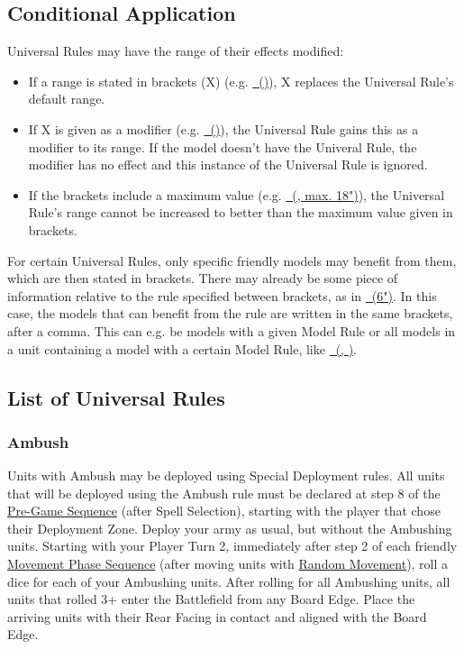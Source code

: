 \subsection{Conditional Application}
\label{conditional_application_of_rules}
Universal Rules may have the range of their effects modified:
\begin{itemize}
	\item If a range is stated in brackets (X) (e.g. \hyperref[rally_around_the_flag]{\rallyaroundtheflag\ ()}), X replaces the Universal Rule's default range.
	\item If X is given as a modifier (e.g. \hyperref[commanding_presence]{\commandingpresence\ ()}), the Universal Rule gains this as a modifier to its range. If the model doesn’t have the Univeral Rule, the modifier has no effect and this instance of the Universal Rule is ignored.
	\item If the brackets include a maximum value (e.g. \hyperref[commanding_presence]{\commandingpresence\ (, max. 18")}), the Universal Rule's range cannot be increased to better than the maximum value given in brackets.
\end{itemize}
For certain Universal Rules, only specific friendly models may benefit from them, which are then stated in brackets. There may already be some piece of information relative to the rule specified between brackets, as in \hyperref[commanding_presence]{\commandingpresence\ (6")}. In this case, the models that can benefit from the rule are written in the same brackets, after a comma. This can e.g. be models with a given Model Rule or all models in a unit containing a model with a certain Model Rule, like \hyperref[commanding_presence]{\commandingpresence\ (, \insignificant)}.

\subsection{List of Universal Rules}
\label{list_of_universal_rules}

\subsubsection{Ambush}
\idx[main=y]{\ambush}\label{ambush}

Units with Ambush may be deployed using Special Deployment rules. All units that will be deployed using the Ambush rule must be declared at step 8 of the \hyperref[the_pre_game_sequence]{Pre-Game Sequence} (after Spell Selection), starting with the player that chose their Deployment Zone. Deploy your army as usual, but without the Ambushing units. Starting with your Player Turn 2, immediately after step 2 of each friendly \hyperref[the_movement_phase_sequence]{Movement Phase Sequence} (after moving units with \hyperref[random_movement]{Random Movement}), roll a dice for each of your Ambushing units. After rolling for all Ambushing units, all units that rolled 3+ enter the Battlefield from any Board Edge. Place the arriving units with their Rear Facing in contact and aligned with the Board Edge.

